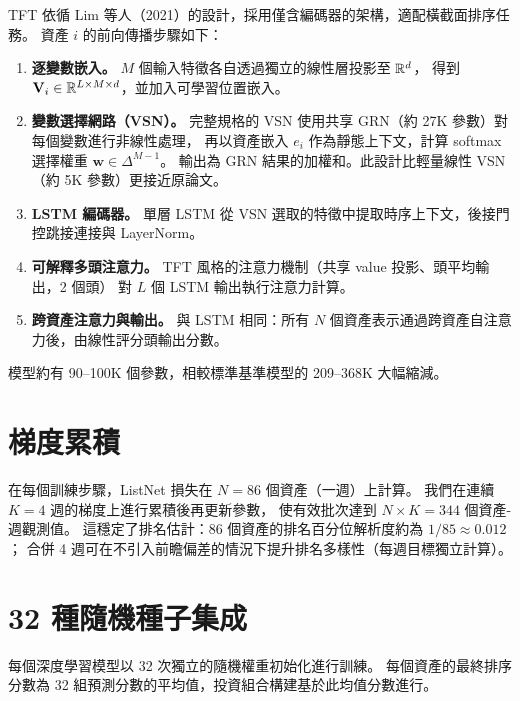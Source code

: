 TFT 依循 Lim 等人（2021）的設計，採用僅含編碼器的架構，適配橫截面排序任務。
資產 $i$ 的前向傳播步驟如下：

\begin{enumerate}[nosep]
  \item \textbf{逐變數嵌入。}
        $M$ 個輸入特徵各自透過獨立的線性層投影至 $\mathbb{R}^d$，
        得到 $\mathbf{V}_i \in \mathbb{R}^{L \times M \times d}$，並加入可學習位置嵌入。

  \item \textbf{變數選擇網路（VSN）。}
        完整規格的 VSN 使用共享 GRN（約 27K 參數）對每個變數進行非線性處理，
        再以資產嵌入 $e_i$ 作為靜態上下文，計算 softmax 選擇權重 $\mathbf{w} \in \Delta^{M-1}$。
        輸出為 GRN 結果的加權和。此設計比輕量線性 VSN（約 5K 參數）更接近原論文。

  \item \textbf{LSTM 編碼器。}
        單層 LSTM 從 VSN 選取的特徵中提取時序上下文，後接門控跳接連接與 LayerNorm。

  \item \textbf{可解釋多頭注意力。}
        TFT 風格的注意力機制（共享 value 投影、頭平均輸出，2 個頭）
        對 $L$ 個 LSTM 輸出執行注意力計算。

  \item \textbf{跨資產注意力與輸出。}
        與 LSTM 相同：所有 $N$ 個資產表示通過跨資產自注意力後，由線性評分頭輸出分數。
\end{enumerate}

\noindent 模型約有 90--100K 個參數，相較標準基準模型的 209--368K 大幅縮減。

\section{梯度累積}
\label{sec:method:gradacc}

在每個訓練步驟，ListNet 損失在 $N = 86$ 個資產（一週）上計算。
我們在連續 $K = 4$ 週的梯度上進行累積後再更新參數，
使有效批次達到 $N \times K = 344$ 個資產-週觀測值。
這穩定了排名估計：86 個資產的排名百分位解析度約為 $1/85 \approx 0.012$；
合併 4 週可在不引入前瞻偏差的情況下提升排名多樣性（每週目標獨立計算）。

\section{32 種隨機種子集成}
\label{sec:method:ensemble}

每個深度學習模型以 32 次獨立的隨機權重初始化進行訓練。
每個資產的最終排序分數為 32 組預測分數的平均值，投資組合構建基於此均值分數進行。

